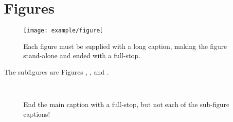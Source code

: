 %
%
\chapter{Figures}



\begin{figure}[h!tb]
\centering

\texttt{[image: example/figure]} %
 
\caption[Do not end short caption with full-stop]{Each figure must be supplied with a long caption, making the figure stand-alone and ended with a full-stop.}

\end{figure}





\newpage





%

The subfigures are Figures , ,  and .

\begin{figure}
\centering

\quad
{}
\\
\quad
{}
\caption[Do not end short caption with full-stop]{End the main caption with a full-stop, but not each of the sub-figure captions!}
\label{thislabel}
\end{figure}
